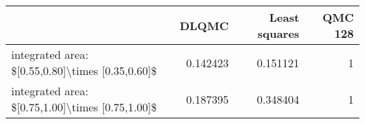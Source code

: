 \begin{tabular}{lrrr}
\toprule
                                                  &    DLQMC &   Least squares &   QMC 128 \\
\midrule
 integrated area: \$[0.55,0.80]\textbackslash{}times [0.35,0.60]\$ & 0.142423 &        0.151121 &         1 \\
 integrated area: \$[0.75,1.00]\textbackslash{}times [0.75,1.00]\$ & 0.187395 &        0.348404 &         1 \\
\bottomrule
\end{tabular}
